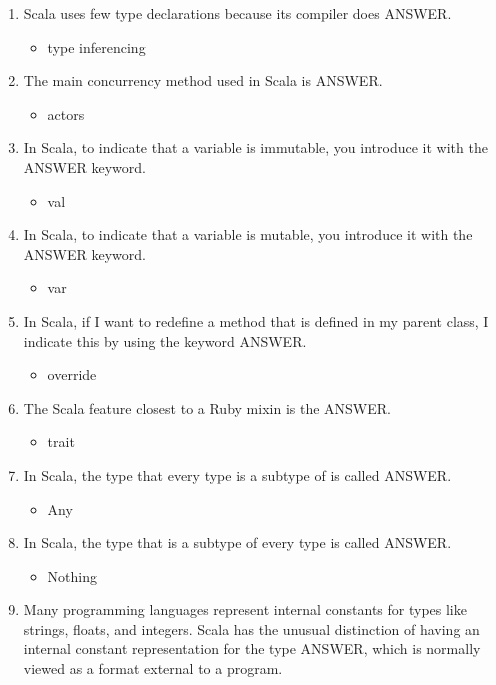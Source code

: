 \documentclass{exam}
\begin{document}
\begin{enumerate}
\begin{itemize}
\end{itemize}
\item Scala uses few type declarations because its compiler does ANSWER.
\begin{itemize}
\item type inferencing
\end{itemize}
\item The main concurrency method used in Scala is ANSWER.
\begin{itemize}
\item actors
\end{itemize}
\item In Scala, to indicate that a variable is immutable, you introduce it with the ANSWER keyword.
\begin{itemize}
\item val
\end{itemize}
\item In Scala, to indicate that a variable is mutable, you introduce it with the ANSWER keyword.
\begin{itemize}
\item var
\end{itemize}
\item In Scala, if I want to redefine a method that is defined in my parent class, I indicate this by using the keyword ANSWER.
\begin{itemize}
\item override
\end{itemize}
\item The Scala feature closest to a Ruby mixin is the ANSWER.
\begin{itemize}
\item trait
\end{itemize}
\item In Scala, the type that every type is a subtype of is called ANSWER.
\begin{itemize}
\item Any
\end{itemize}
\item In Scala, the type that is a subtype of every type is called ANSWER.
\begin{itemize}
\item Nothing
\end{itemize}
\item Many programming languages represent internal constants for types like strings, floats, and integers.  Scala has the unusual distinction of having an internal constant representation for the type ANSWER, which is normally viewed as a format external to a program.

\end{enumerate}
\end{document}
